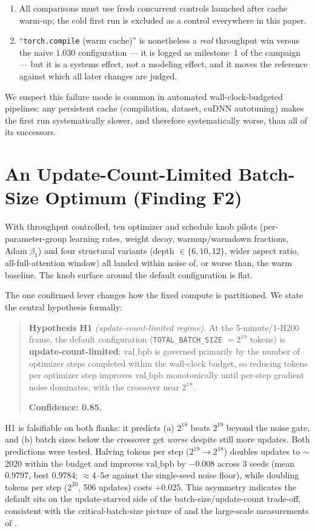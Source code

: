 \documentclass{article}
\newcommand{\valbpb}{\mathrm{val\_bpb}}
\begin{document}
\begin{enumerate}
    \item All comparisons must use fresh concurrent controls launched after cache warm-up; the cold first run is excluded as a control everywhere in this paper.
    \item ``\texttt{torch.compile} (warm cache)'' is nonetheless a \emph{real} throughput win versus the naive $1.030$ configuration --- it is logged as milestone~1 of the campaign --- but it is a systems effect, not a modeling effect, and it moves the reference against which all later changes are judged.
\end{enumerate}

We suspect this failure mode is common in automated wall-clock-budgeted pipelines: any persistent cache (compilation, dataset, cuDNN autotuning) makes the first run systematically slower, and therefore systematically worse, than all of its successors.

\section{An Update-Count-Limited Batch-Size Optimum (Finding F2)}
\label{sec:batchsize}

With throughput controlled, ten optimizer and schedule knob pilots (per-parameter-group learning rates, weight decay, warmup/warmdown fractions, Adam $\beta_1$) and four structural variants (depth $\in \{6, 10, 12\}$, wider aspect ratio, all-full-attention window) all landed within noise of, or worse than, the warm baseline. The knob surface around the default configuration is flat.

The one confirmed lever changes how the fixed compute is partitioned. We state the central hypothesis formally:

\begin{quote}
\textbf{Hypothesis H1} \emph{(update-count-limited regime).} At the 5-minute/1-H200 frame, the default configuration (\texttt{TOTAL\_BATCH\_SIZE} $= 2^{19}$ tokens) is \textbf{update-count-limited}: $\valbpb$ is governed primarily by the number of optimizer steps completed within the wall-clock budget, so reducing tokens per optimizer step improves $\valbpb$ monotonically until per-step gradient noise dominates, with the crossover near $2^{18}$.

\textbf{Confidence: 0.85.}
\end{quote}

H1 is falsifiable on both flanks: it predicts (a) $2^{18}$ beats $2^{19}$ beyond the noise gate, and (b) batch sizes below the crossover get \emph{worse} despite still more updates. Both predictions were tested. Halving tokens per step ($2^{19} \rightarrow 2^{18}$) doubles updates to $\sim$2020 within the budget and improves $\valbpb$ by $-0.008$ across 3 seeds (mean $0.9797$, best $0.9784$; $\approx 4$--$5\sigma$ against the single-seed noise floor), while doubling tokens per step ($2^{20}$, 506 updates) costs $+0.025$. This asymmetry indicates the default sits on the update-starved side of the batch-size/update-count trade-off, consistent with the critical-batch-size picture of \citet{mccandlish2018empirical} and the large-scale measurements of \citet{shallue2019measuring}.
\end{document}
